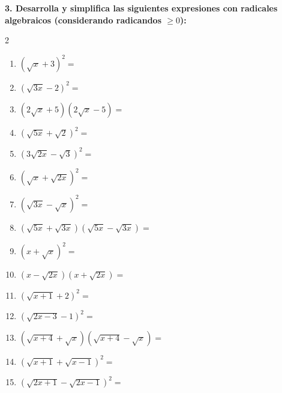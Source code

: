 \documentclass[11pt,a4paper]{article}
\begin{document}
\vspace{0.2cm}
\textbf{3. Desarrolla y simplifica las siguientes expresiones con radicales algebraicos (considerando radicandos $\ge 0$):}

\begin{multicols}{2}
\begin{enumerate}[label=\textbf{\alph*)}]
    \item $\left(\sqrt{x} + 3\right)^2 =$
    \item $\left(\sqrt{3x} - 2\right)^2 =$
    \item $\left(2\sqrt{x} + 5\right)\left(2\sqrt{x} - 5\right) =$
    \item $\left(\sqrt{5x} + \sqrt{2}\right)^2 =$
    \item $\left(3\sqrt{2x} - \sqrt{3}\right)^2 =$

    \item $\left(\sqrt{x} + \sqrt{2x}\right)^2 =$
    \item $\left(\sqrt{3x} - \sqrt{x}\right)^2 =$
    \item $\left(\sqrt{5x} + \sqrt{3x}\right)\left(\sqrt{5x} - \sqrt{3x}\right) =$
    \item $\left(x + \sqrt{x}\right)^2 =$
    \item $\left(x - \sqrt{2x}\right)\left(x + \sqrt{2x}\right) =$

    \item $\left(\sqrt{x + 1} + 2\right)^2 =$
    \item $\left(\sqrt{2x - 3} - 1\right)^2 =$
    \item $\left(\sqrt{x + 4} + \sqrt{x}\right)\left(\sqrt{x + 4} - \sqrt{x}\right) =$
    \item $\left(\sqrt{x + 1} + \sqrt{x - 1}\right)^2 =$
    \item $\left(\sqrt{2x + 1} - \sqrt{2x - 1}\right)^2 =$
\end{enumerate}
\end{multicols}
\end{document}
